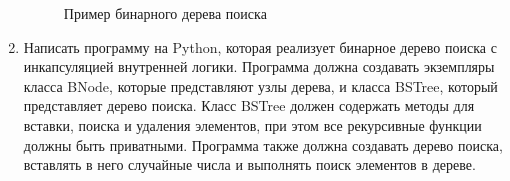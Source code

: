 \begin{enumerate}
\begin{figure}[h]
\centering
{}
\caption{Пример бинарного дерева поиска}
\end{figure}

\item Написать программу на Python, которая реализует бинарное дерево поиска с инкапсуляцией внутренней логики. Программа должна создавать экземпляры класса BNode, которые представляют узлы дерева, и класса BSTree, который представляет дерево поиска. Класс BSTree должен содержать методы для вставки, поиска и удаления элементов, при этом все рекурсивные функции должны быть приватными. Программа также должна создавать дерево поиска, вставлять в него случайные числа и выполнять поиск элементов в дереве.


\end{enumerate}
